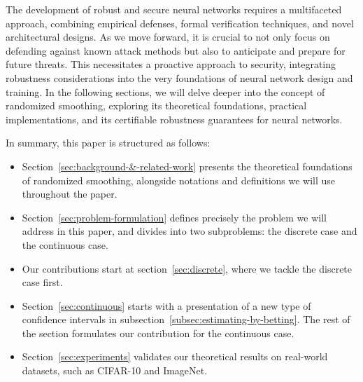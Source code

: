 The development of robust and secure neural networks requires a multifaceted approach, combining empirical defenses, formal verification techniques, and novel architectural designs.
As we move forward, it is crucial to not only focus on defending against known attack methods but also to anticipate and prepare for future threats.
This necessitates a proactive approach to security, integrating robustness considerations into the very foundations of neural network design and training.
In the following sections, we will delve deeper into the concept of randomized smoothing, exploring its theoretical foundations, practical implementations, and its certifiable robustness guarantees for neural networks.

In summary, this paper is structured as follows:
\begin{itemize}
    \item Section~\ref{sec:background-&-related-work} presents the theoretical foundations of randomized smoothing, alongside notations and definitions we will use throughout the paper.
    \item Section~\ref{sec:problem-formulation} defines precisely the problem we will address in this paper, and divides into two subproblems: the discrete case and the continuous case.
    \item Our contributions start at section~\ref{sec:discrete}, where we tackle the discrete case first.
    \item Section~\ref{sec:continuous} starts with a presentation of a new type of confidence intervals in subsection~\ref{subsec:estimating-by-betting}. The rest of the section formulates our contribution for the continuous case.
    \item Section~\ref{sec:experiments} validates our theoretical results on real-world datasets, such as CIFAR-10 and ImageNet.
\end{itemize}
